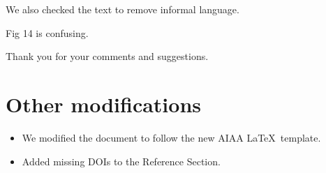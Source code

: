 \documentclass{mdolab-response}
\begin{document}
\begin{response}
    We also checked the text to remove informal language.
\end{response}


\begin{revcom}
    Fig 14 is confusing.
\end{revcom}

\begin{response}
\end{response}


Thank you for your comments and suggestions.

\section*{Other modifications}

\begin{itemize}

    \item We modified the document to follow the new AIAA \LaTeX \ template.

    \item Added missing DOIs to the Reference Section.

\end{itemize}



\end{document}
